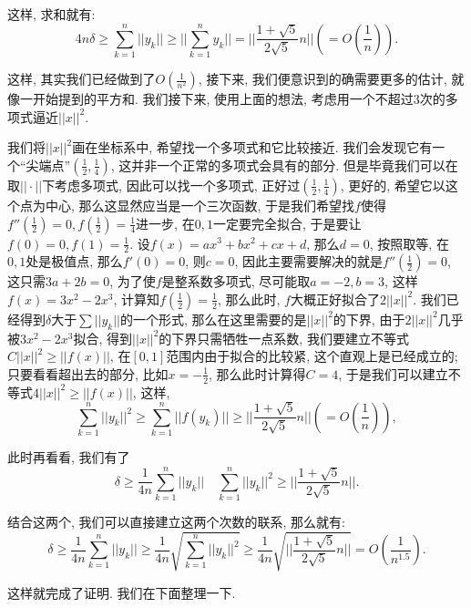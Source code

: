 \documentclass[lang=cn,12pt,thmcnt=section]{elegantbook}
\begin{document}
\begin{analysis}
这样, 求和就有: 
\[
4n\delta \ge \sum_{k=1}^n ||y_k||\ge ||\sum_{k=1}^n y_k||=||\frac{1+\sqrt{5}}{2\sqrt{5}}n||\left(= O\left(\frac{1}{n}\right)\right).
\]

这样, 其实我们已经做到了$O(\frac{1}{n^2})$, 接下来, 我们便意识到的确需要更多的估计, 就像一开始提到的平方和. 我们接下来, 使用上面的想法, 考虑用一个不超过$3$次的多项式逼近$||x||^2$.

我们将$||x||^2$画在坐标系中, 希望找一个多项式和它比较接近. 我们会发现它有一个“尖端点”$(\frac{1}{2},\frac{1}{4})$, 这并非一个正常的多项式会具有的部分. 但是毕竟我们可以在取$||\cdot||$下考虑多项式, 因此可以找一个多项式, 正好过$(\frac{1}{2},\frac{1}{4})$, 更好的, 希望它以这个点为中心, 那么这显然应当是一个三次函数, 于是我们希望找$f$使得$f''(\frac{1}{2})=0,f(\frac{1}{2})=\frac{1}{4}$进一步, 在$0,1$一定要完全拟合, 于是要让$f(0)=0,f(1)=\frac{1}{2}$. 设$f(x)=ax^3+bx^2+cx+d$, 那么$d=0$, 按照取等, 在$0,1$处是极值点, 那么$f'(0)=0$, 则$c=0$, 因此主要需要解决的就是$f''(\frac{1}{2})=0$, 这只需$3a+2b=0$, 为了使$f$是整系数多项式, 尽可能取$a=-2,b=3$, 这样$f(x)=3x^2-2x^3$, 计算知$f(\frac{1}{2})=\frac{1}{2}$, 那么此时, $f$大概正好拟合了$2||x||^2$. 我们已经得到$\delta$大于$\sum ||y_k||$的一个形式, 那么在这里需要的是$||x||^2$的下界, 由于$2||x||^2$几乎被$3x^2-2x^3$拟合, 得到$||x||^2$的下界只需牺牲一点系数, 我们要建立不等式$C||x||^2\ge ||f(x)||$, 在$[0,1]$范围内由于拟合的比较紧, 这个直观上是已经成立的; 只要看看超出去的部分, 比如$x=-\frac{1}{2}$, 那么此时计算得$C=4$, 于是我们可以建立不等式$4||x||^2\ge ||f(x)||$, 这样, 
\[
\sum_{k=1}^n ||y_k||^2\ge \sum_{k=1}^n ||f(y_k)||\ge ||\frac{1+\sqrt{5}}{2\sqrt{5}}n||\left(= O\left(\frac{1}{n}\right)\right),
\]

此时再看看, 我们有了
\[
\delta \ge \frac{1}{4n}\sum_{k=1}^n ||y_k||\quad \sum_{k=1}^n ||y_k||^2\ge ||\frac{1+\sqrt{5}}{2\sqrt{5}}n||.
\]

结合这两个, 我们可以直接建立这两个次数的联系, 那么就有: 
\[
\delta \ge \frac{1}{4n}\sum_{k=1}^n ||y_k||\ge \frac{1}{4n}\sqrt{\sum_{k=1}^n ||y_k||^2}\ge  \frac{1}{4n}\sqrt{||\frac{1+\sqrt{5}}{2\sqrt{5}}n||}= O\left(\frac{1}{n^{1.5}}\right).
\]

这样就完成了证明. 我们在下面整理一下.
\end{analysis}
\end{document}
